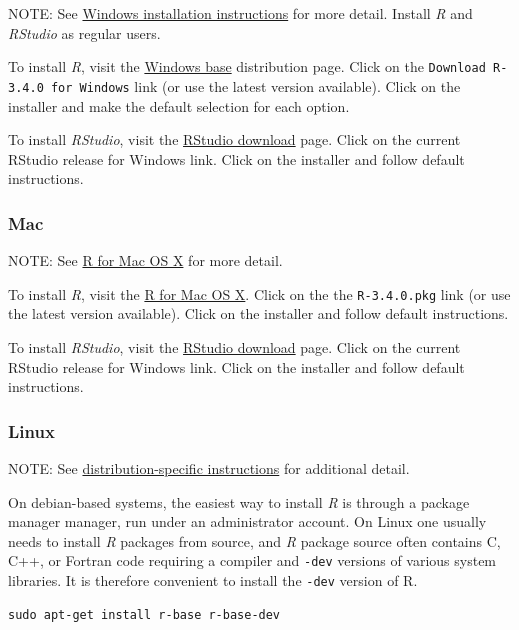 \documentclass[]{article}
\theoremstyle{definition}
\theoremstyle{definition}
\theoremstyle{remark}
\begin{document}
NOTE: See \href{https://cran.r-project.org/bin/windows/}{Windows
installation instructions} for more detail. Install \emph{R} and
\emph{RStudio} as regular users.

To install \emph{R}, visit the
\href{https://cran.r-project.org/bin/windows/base/}{Windows base}
distribution page. Click on the \texttt{Download\ R-3.4.0\ for\ Windows}
link (or use the latest version available). Click on the installer and
make the default selection for each option.

To install \emph{RStudio}, visit the
\href{https://www.rstudio.com/products/rstudio/download/}{RStudio
download} page. Click on the current RStudio release for Windows link.
Click on the installer and follow default instructions.

\subsubsection{Mac}\label{mac}

NOTE: See \href{https://cran.r-project.org/bin/macosx/}{R for Mac OS X}
for more detail.

To install \emph{R}, visit the
\href{https://cran.r-project.org/bin/macosx/}{R for Mac OS X}. Click on
the the \texttt{R-3.4.0.pkg} link (or use the latest version available).
Click on the installer and follow default instructions.

To install \emph{RStudio}, visit the
\href{https://www.rstudio.com/products/rstudio/download/}{RStudio
download} page. Click on the current RStudio release for Windows link.
Click on the installer and follow default instructions.

\subsubsection{Linux}\label{linux}

NOTE: See
\href{https://cran.r-project.org/bin/linux/}{distribution-specific
instructions} for additional detail.

On debian-based systems, the easiest way to install \emph{R} is through
a package manager manager, run under an administrator account. On Linux
one usually needs to install \emph{R} packages from source, and \emph{R}
package source often contains C, C++, or Fortran code requiring a
compiler and \texttt{-dev} versions of various system libraries. It is
therefore convenient to install the \texttt{-dev} version of R.

\begin{verbatim}
sudo apt-get install r-base r-base-dev
\end{verbatim}
\end{document}
